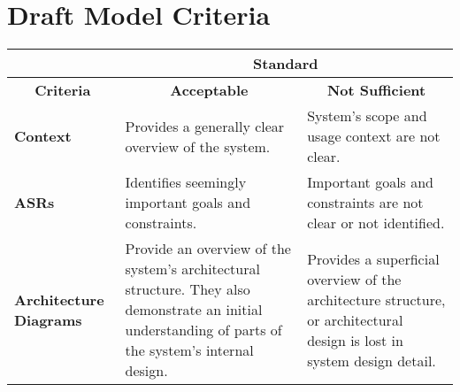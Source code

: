 \documentclass{csse4400}
\begin{document}




\section*{Draft Model Criteria}

\begin{table}[h]
\centering
\footnotesize
\begin{tabular}{|p{2cm}|p{7.5cm}p{7.5cm}|}
\hline  & \multicolumn{2}{c|}{\textbf{Standard}}  \\ \hline
\multicolumn{1}{|c|}{\textbf{Criteria}} & \multicolumn{1}{c|}{\textbf{Acceptable}}  & \multicolumn{1}{c|}{\textbf{Not Sufficient}}  \\ \hline
\textbf{Context}               & \multicolumn{1}{p{7.5cm}|}{Provides a generally clear overview of the system.}    & System's scope and usage context are not clear.  \\ \hline
\textbf{ASRs}                  & \multicolumn{1}{p{7.5cm}|}{Identifies seemingly important goals and constraints.} & Important goals and constraints are not clear or not identified.                                                        \\ \hline
\textbf{Architecture Diagrams} & \multicolumn{1}{p{7.5cm}|}{Provide an overview of the system’s architectural structure. They also demonstrate an initial understanding of parts of the system’s internal design.} & Provides a superficial overview of the architecture structure, or architectural design is lost in system design detail. \\ \hline
\end{tabular}
\end{table}



\end{document}
